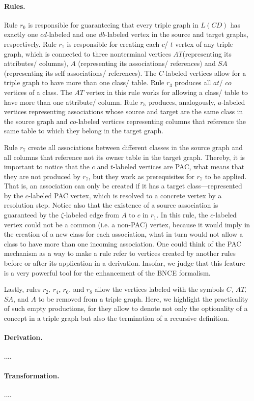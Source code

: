 \paragraph*{Rules. } Rule $r_0$ is responsible for guaranteeing that every triple graph in $L(CD)$ has exactly one $cd$-labeled and one $db$-labeled vertex in the source and target graphs, respectively. Rule $r_1$ is responsible for creating each $c$/ $t$ vertex of any triple graph, which is connected to three nonterminal vertices $AT$(representing its attributes/ columns), $A$ (representing its associations/ references) and $SA$ (representing its self associations/ references). The $C$-labeled vertices allow for a triple graph to have more than one class/ table. Rule $r_3$ produces all $at$/ $co$ vertices of a class. The $AT$ vertex in this rule works for allowing a class/ table to have more than one attribute/ column. Rule $r_5$ produces, analogously, $a$-labeled vertices representing associations whose source and target are the same class in the source graph and $co$-labeled vertices representing columns that reference the same table to which they belong in the target graph. 

Rule $r_7$ create all associations between different classes in the source graph and all columns that reference not its owner table in the target graph. Thereby, it is important to notice that the $c$ and $t$-labeled vertices are PAC, what means that they are not produced by $r_7$, but they work as prerequisites for $r_7$ to be applied. That is, an association can only be created if it has a target class---represented by the $c$-labeled PAC vertex, which is resolved to a concrete vertex by a resolution step. Notice also that the existence of a source association is guaranteed by the $\zeta$-labeled edge from $A$ to $c$ in $r_1$. In this rule, the $c$-labeled vertex could not be a common (i.e. a non-PAC) vertex, because it would imply in the creation of a new class for each association, what in turn would not allow a class to have more than one incoming association. One could think of the PAC mechanism as a way to make a rule refer to vertices created by another rules before or after its application in a derivation. Insofar, we judge that this feature is a very powerful tool for the enhancement of the BNCE formalism.

Lastly, rules $r_2$, $r_4$, $r_6$, and $r_8$ allow the vertices labeled with the symbols $C$, $AT$, $SA$, and $A$ to be removed from a triple graph. Here, we highlight the practicality of such empty productions, for they allow to denote not only the optionality of a concept in a triple graph but also the termination of a recursive definition.

\paragraph*{Derivation. } ....


\paragraph*{Transformation. } ....
